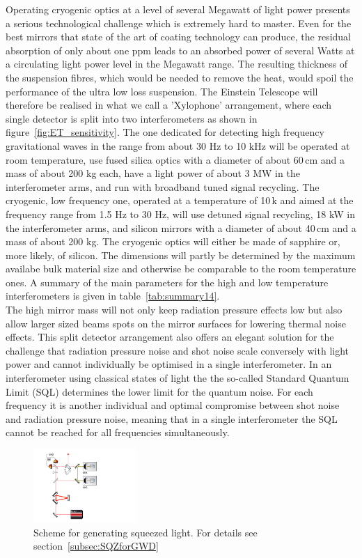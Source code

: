Operating cryogenic optics at a level of several Megawatt of light power presents a serious technological challenge which is extremely hard to master. Even for the best mirrors that state of the art of coating technology can produce, the residual absorption of only about one ppm leads to an absorbed power of several Watts at a circulating light power level in the Megawatt range. The resulting thickness of the suspension fibres, which would be needed to remove the heat, would spoil the performance of the ultra low loss suspension. The Einstein Telescope will therefore be realised in what we call a 'Xylophone' arrangement, where each single detector is split into two interferometers as shown in figure~\ref{fig:ET_sensitivity}. The one dedicated for detecting high frequency gravitational waves in the range from about 30 Hz to 10 kHz will be operated at room temperature, use fused silica optics with a diameter of about 60\,cm and a mass of about 200 kg each, have a light power of about 3 MW in the interferometer arms, and run with broadband tuned signal recycling. The cryogenic, low frequency one, operated at a temperature of 10\,k and aimed at the frequency range from 1.5 Hz to 30 Hz, will use detuned signal recycling, 18 kW in the interferometer arms, and silicon mirrors with a diameter of about 40\,cm and a mass of about 200 kg. The cryogenic optics will either be made of sapphire or, more likely, of silicon. The dimensions will partly be determined by the maximum availabe bulk material size and otherwise be comparable to the room temperature ones. A summary of the main parameters for the high and low temperature interferometers is given in table~\ref{tab:summary14}.\\
 The high mirror mass will not only keep radiation pressure effects low but also allow larger sized beams spots on the mirror surfaces for lowering thermal noise effects. This split detector arrangement also offers an elegant solution for the challenge that radiation pressure noise and shot noise scale conversely with light power and cannot individually be optimised in a single interferometer. In an interferometer using classical states of light the the so-called Standard Quantum Limit (SQL)  determines the lower limit for the quantum noise. For each frequency it is another individual and optimal compromise between shot noise and radiation pressure noise, meaning that in a single interferometer the SQL cannot be reached for all frequencies simultaneously. 
 
\begin{figure}
	\centering
		\includegraphics[width=0.35\textwidth]{Sec_Introduction/SqzGenIntro.pdf}
	\caption{Scheme for generating squeezed light. For details see section~\ref{subsec:SQZforGWD}}
	\label{fig:SqzGenIntro}
\end{figure} 

